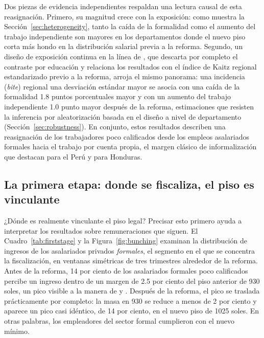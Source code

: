 Dos piezas de evidencia independientes respaldan una lectura causal de esta reasignación. Primero, su magnitud crece con la exposición: como muestra la Sección~\ref{sec:heterogeneity}, tanto la caída de la formalidad como el aumento del trabajo independiente son mayores en los departamentos donde el nuevo piso corta más hondo en la distribución salarial previa a la reforma. Segundo, un diseño de exposición continua en la línea de \citet{card_1992}, que descarta por completo el contraste por educación y relaciona los resultados con el índice de Kaitz regional estandarizado previo a la reforma, arroja el mismo panorama: una incidencia (\emph{bite}) regional una desviación estándar mayor se asocia con una caída de la formalidad 1.8 puntos porcentuales mayor y con un aumento del trabajo independiente 1.0 punto mayor después de la reforma, estimaciones que resisten la inferencia por aleatorización basada en el diseño a nivel de departamento (Sección~\ref{sec:robustness}). En conjunto, estos resultados describen una reasignación de los trabajadores poco calificados desde los empleos asalariados formales hacia el trabajo por cuenta propia, el margen clásico de informalización que destacan \citet{jaramillo_lopez_2006} para el Perú y \citet{ham_2018_honduras} para Honduras.



\subsection{La primera etapa: donde se fiscaliza, el piso es vinculante}

¿Dónde es realmente vinculante el piso legal? Precisar esto primero ayuda a interpretar los resultados sobre remuneraciones que siguen. El Cuadro~\ref{tab:firststage} y la Figura~\ref{fig:bunching} examinan la distribución de ingresos de los asalariados privados \emph{formales}, el segmento en el que se concentra la fiscalización, en ventanas simétricas de tres trimestres alrededor de la reforma. Antes de la reforma, 14 por ciento de los asalariados formales poco calificados percibe un ingreso dentro de un margen de 2.5 por ciento del piso anterior de 930 soles, un pico visible a la manera de \citet{cengiz_2019} y \citet{engbom_moser_2022}. Después de la reforma, el pico se traslada prácticamente por completo: la masa en 930 se reduce a menos de 2 por ciento y aparece un pico casi idéntico, de 14 por ciento, en el nuevo piso de 1025 soles. En otras palabras, los empleadores del sector formal cumplieron con el nuevo mínimo.

